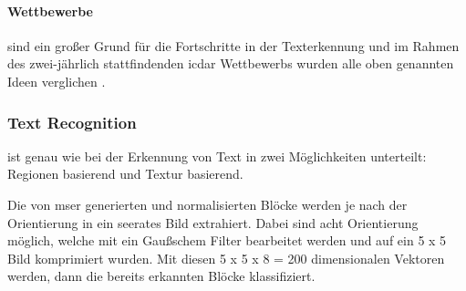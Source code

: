 \paragraph{Wettbewerbe}\label{ICDAR} sind ein großer Grund für die Fortschritte in der Texterkennung und im Rahmen des zwei-jährlich stattfindenden \Gls{icdar} Wettbewerbs wurden alle oben genannten Ideen verglichen \cite{ICDAR:online}.

\subsubsection{Text Recognition} ist genau wie bei der Erkennung von Text in zwei Möglichkeiten unterteilt: Regionen basierend und Textur basierend. 

Die von \gls{mser} generierten und normalisierten Blöcke werden je nach der Orientierung in ein seerates Bild extrahiert. Dabei sind acht Orientierung möglich, welche mit ein Gaußschem Filter bearbeitet werden und auf ein 5 x 5 Bild komprimiert wurden. Mit diesen 5 x 5 x 8 = 200 dimensionalen Vektoren werden, dann die bereits erkannten Blöcke klassifiziert. \cite{SWT:online}
